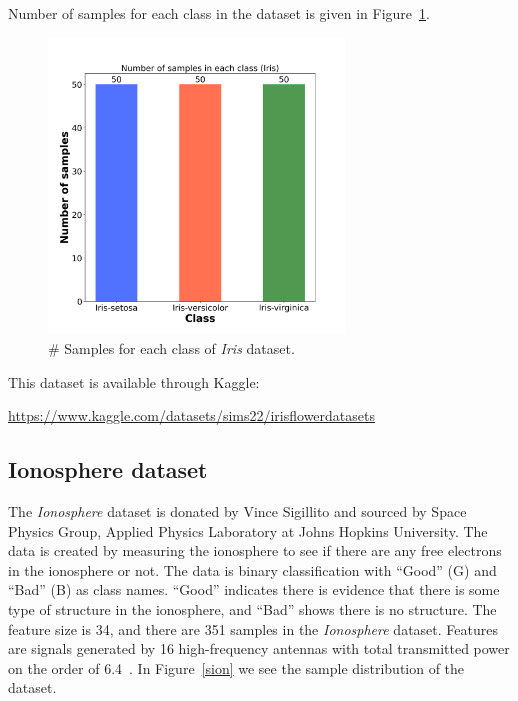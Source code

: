  Number of samples for each class in the dataset is given in Figure~\ref{siris}.

\begin{figure}[H]
    \centering
    \includegraphics[width=0.7\textwidth]{images/sample/iris.png}
    \caption{\# Samples for each class of \textit{Iris} dataset.}
    \label{siris}
\end{figure}
\vspace{10pt}

\noindent This dataset is available through Kaggle:

\noindent \url{https://www.kaggle.com/datasets/sims22/irisflowerdatasets}

\subsection{Ionosphere dataset}

The \textit{Ionosphere} dataset is donated by Vince Sigillito and sourced by Space Physics Group, Applied Physics Laboratory at Johns Hopkins University. The data is created by measuring the ionosphere to see if there are any free electrons in the ionosphere or not. The data is binary classification with “Good” (G) and “Bad” (B) as class names. “Good” indicates there is evidence that there is some type of structure in the ionosphere, and “Bad” shows there is no structure. The feature size is 34, and there are 351 samples in the \textit{Ionosphere} dataset. Features are signals generated by 16 high-frequency antennas with total transmitted power on the order of 6.4~\cite{ion}. In Figure~\ref{sion} we see the sample distribution of the dataset.

